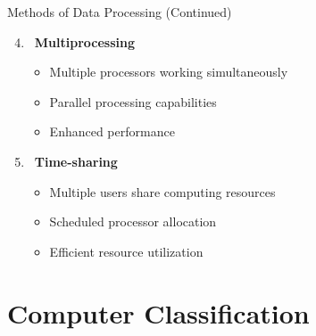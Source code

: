 \documentclass[aspectratio=169]{beamer}
\begin{document}
\begin{frame}{Methods of Data Processing (Continued)}
    \begin{enumerate}
        \setcounter{enumi}{3}
        \item \faMicrochip\, \textbf{Multiprocessing}
        \begin{itemize}
            \item Multiple processors working simultaneously
            \item Parallel processing capabilities
            \item Enhanced performance
        \end{itemize}
        
        \item \faShareAlt\, \textbf{Time-sharing}
        \begin{itemize}
            \item Multiple users share computing resources
            \item Scheduled processor allocation
            \item Efficient resource utilization
        \end{itemize}
    \end{enumerate}
    
    \vspace{0.5cm}
    \begin{center}
    \end{center}
\end{frame}

\section{Computer Classification}
\end{document}
